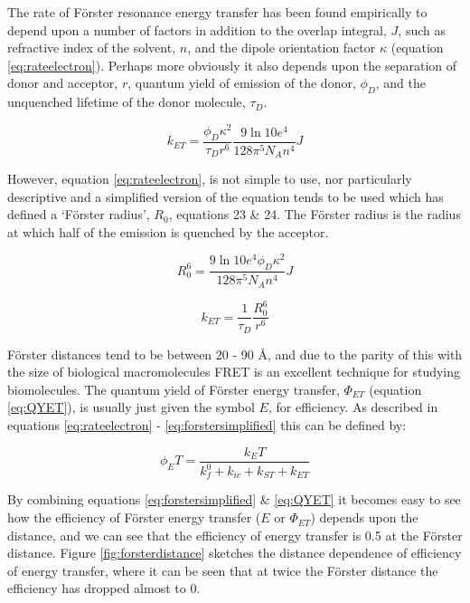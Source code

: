 \documentclass[
]{book}
\begin{document}
The rate of Förster resonance energy transfer has been found empirically to depend upon a number of factors in addition to the overlap integral, \(J\), such as refractive index of the solvent, \(n\), and the dipole orientation factor \(\kappa\) (equation \eqref{eq:rateelectron}). Perhaps more obviously it also depends upon the separation of donor and acceptor, \(r\), quantum yield of emission of the donor, \(\phi_D\), and the unquenched lifetime of the donor molecule, \(\tau_D\).

\begin{equation}
k_{ET}= \frac{\phi_D \kappa^2}{\tau_D r^6}\frac{9 \ln 10 e^4}{128 \pi^5 N_A n^4}J
\label{eq:rateelectron}
\end{equation}

However, equation \eqref{eq:rateelectron}, is not simple to use, nor particularly descriptive and a simplified version of the equation tends to be used which has defined a `Förster radius', \(R_0\), equations 23 \& 24. The Förster radius is the radius at which half of the emission is quenched by the acceptor.

\begin{equation}
R_0^6=\frac{9 \ln 10 e^4 \phi_D \kappa^2}{128 \pi^5 N_A n^4 }J
\label{eq:forsterdistance}
\end{equation}

\begin{equation}
k_{ET}=\frac{1}{\tau_D}\frac{R_0^6}{r^6}
\label{eq:forstersimplified}
\end{equation}

Förster distances tend to be between 20 - 90 Å, and due to the parity of this with the size of biological macromolecules FRET is an excellent technique for studying biomolecules.
The quantum yield of Förster energy transfer, \(Φ_{ET}\) (equation \eqref{eq:QYET}), is usually just given the symbol \(E\), for efficiency. As described in equations \eqref{eq:rateelectron} - \eqref{eq:forstersimplified} this can be defined by:

\begin{equation}
\phi_ET = \frac{k_ET}{k_f^0+k_{ic}+ k_{ST}+k_{ET}}
\label{eq:QYET}
\end{equation}

By combining equations \eqref{eq:forstersimplified} \& \eqref{eq:QYET} it becomes easy to see how the efficiency of Förster energy transfer (\(E\) or \(Φ_{ET}\)) depends upon the distance, and we can see that the efficiency of energy transfer is 0.5 at the Förster distance. Figure \ref{fig:forsterdistance} sketches the distance dependence of efficiency of energy transfer, where it can be seen that at twice the Förster distance the efficiency has dropped almost to 0.
\end{document}
